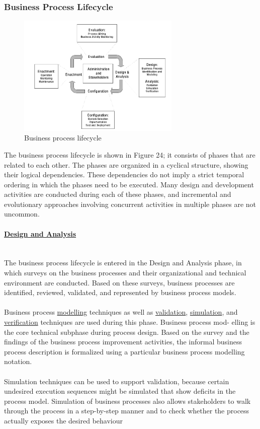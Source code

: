 \documentclass[10pt,a4paper]{article}
\newcommand{\myparagraph}[1]{\paragraph{\uline{#1}}\mbox{}\\[0.05in]}
\begin{document}
\subsubsection{Business Process Lifecycle}
\begin{figure}[ht!]
 \hfill \includegraphics[width=220pt]{images/business-process-lifecycle}\hspace*{\fill}
 \caption{Business process lifecycle}
  \label{fig:bpl}
\end{figure}
The business process lifecycle is shown in Figure 24; it consists of phases that are related to each other. The phases are organized in a cyclical structure, showing their logical dependencies. These dependencies do not imply a strict temporal ordering in which the phases need to be executed. Many design and development activities are conducted during each of these phases, and incremental and evolutionary approaches involving concurrent activities in multiple phases are not uncommon.
\myparagraph{Design and Analysis}
The business process lifecycle is entered in the Design and Analysis phase, in which surveys on the business processes and their organizational and technical environment are conducted. Based on these surveys, business processes are identified, reviewed, validated, and represented by business process models. \\ \\
Business process \uline{modelling} techniques as well as \uline{validation}, \uline{simulation}, and \uline{verification} techniques are used during this phase. Business process mod- elling is the core technical subphase during process design. Based on the survey and the findings of the business process improvement activities, the informal business process description is formalized using a particular business process modelling notation. \\ \\
Simulation techniques can be used to support validation, because certain undesired execution sequences might be simulated that show deficits in the process model. Simulation of business processes also allows stakeholders to walk through the process in a step-by-step manner and to check whether the process actually exposes the desired behaviour
\end{document}
